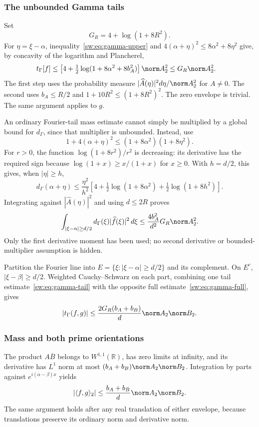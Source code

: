 \documentclass[11pt,a4paper]{article}
\numberwithin{equation}{section}
\theoremstyle{definition}\newtheorem{definition}[theorem]{Definition}
\theoremstyle{remark}\newtheorem{remark}[theorem]{Remark}
\newcommand{\R}{\mathbb R}\newcommand{\C}{\mathbb C}\newcommand{\N}{\mathbb N}
\newcommand{\tg}{t_\Gamma}\newcommand{\cg}{c_\Gamma}
\begin{document}
\subsubsection{The unbounded Gamma tails}
Set
\begin{equation}\label{sw:eq:GR}
 G_R=4+\log(1+8R^2).
\end{equation}
For $\eta=\xi-\alpha$, inequality~\eqref{sw:eq:gamma-upper} and $4(\alpha+\eta)^2\le8\alpha^2+8\eta^2$ give, by concavity of the logarithm and Plancherel,
\begin{align}\label{sw:eq:gamma-full}
 \tg[f]&\le\left[4+\tfrac12\log(1+8\alpha^2+8b_A^2)\right]\norm A_2^2
 \le G_R\norm A_2^2.
\end{align}
The first step uses the probability measure $|\widehat A(\eta)|^2d\eta/\norm A_2^2$ for $A\ne0$. The second uses $b_A\le R/2$ and $1+10R^2\le(1+8R^2)^2$. The zero envelope is trivial. The same argument applies to $g$.

An ordinary Fourier-tail mass estimate cannot simply be multiplied by a global bound for $d_\Gamma$, since that multiplier is unbounded. Instead, use
\[
 1+4(\alpha+\eta)^2\le(1+8\alpha^2)(1+8\eta^2).
\]
For $r>0$, the function $\log(1+8r^2)/r^2$ is decreasing: its derivative has the required sign because $\log(1+x)\ge x/(1+x)$ for $x\ge0$. With $h=d/2$, this gives, when $|\eta|\ge h$,
\[
 d_\Gamma(\alpha+\eta)
 \le\frac{\eta^2}{h^2}
       \left[4+\tfrac12\log(1+8\alpha^2)+\tfrac12\log(1+8h^2)\right].
\]
Integrating against $|\widehat A(\eta)|^2$ and using $d\le2R$ proves
\begin{equation}\label{sw:eq:gamma-tail}
 \int_{|\xi-\alpha|\ge d/2}d_\Gamma(\xi)|\widehat f(\xi)|^2\,d\xi
 \le\frac{4b_A^2}{d^2}G_R\norm A_2^2.
\end{equation}
Only the first derivative moment has been used; no second derivative or bounded-multiplier assumption is hidden.

Partition the Fourier line into $E=\{\xi:|\xi-\alpha|\ge d/2\}$ and its complement. On $E^c$, $|\xi-\beta|\ge d/2$. Weighted Cauchy--Schwarz on each part, combining one tail estimate~\eqref{sw:eq:gamma-tail} with the opposite full estimate~\eqref{sw:eq:gamma-full}, gives
\begin{equation}\label{sw:eq:gamma-cross}
 |\tg(f,g)|\le\frac{2G_R(b_A+b_B)}d\norm A_2\norm B_2.
\end{equation}

\subsubsection{Mass and both prime orientations}
The product $A\overline B$ belongs to $W^{1,1}(\R)$, has zero limits at infinity, and its derivative has $L^1$ norm at most
$(b_A+b_B)\norm A_2\norm B_2$. Integration by parts against $e^{i(\alpha-\beta)x}$ yields
\begin{equation}\label{sw:eq:mass-cross}
 |\langle f,g\rangle_2|\le\frac{b_A+b_B}{d}\norm A_2\norm B_2.
\end{equation}
The same argument holds after any real translation of either envelope, because translations preserve its ordinary norm and derivative norm.
\end{document}
